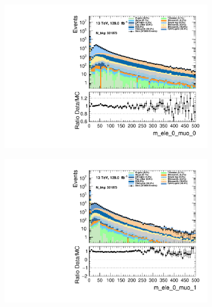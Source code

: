 \begin{figure}
    \centering
    \begin{subfigure}{.49\textwidth}
        \includegraphics[width=\textwidth]{Figures/MC_Data_comp/m_ele_0_muo_0.pdf}
        \caption{}
        \label{fig:et}
    \end{subfigure}
    \hfill
    \begin{subfigure}{.49\textwidth}
        \includegraphics[width=\textwidth]{Figures/MC_Data_comp/m_ele_0_muo_1.pdf}
        \caption{ }
        \label{fig:flcp}
    \end{subfigure}
    \hfill 
    \begin{subfigure}{.49\textwidth}

\end{subfigure}
\end{figure}
